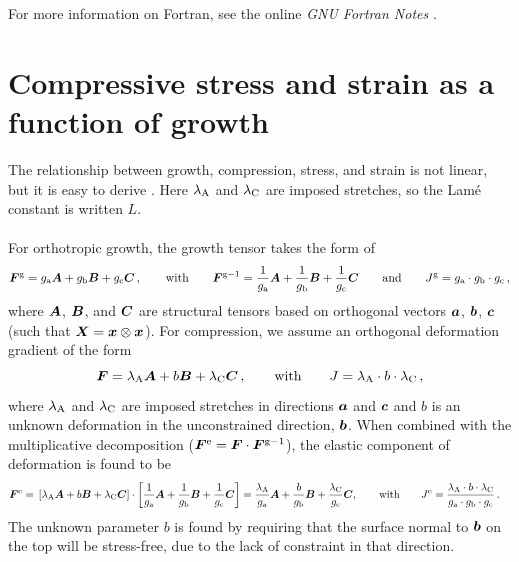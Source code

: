 \documentclass[10pt,letterpaper,oneside]{report}
\newcommand{\ten}[1]{\mbox{\boldmath $#1$}{}}
\newcommand{\scas}[1]{\mbox{{\scriptsize{${\rm{#1}}$}}}{}}
\begin{document}
For more information on Fortran, see the online \textit{GNU Fortran Notes} \autocite{FortranNotes}.



\chapter{Compressive stress and strain as a function of growth}

The relationship between growth, compression, stress, and strain is not linear, but it is easy to derive \autocite{Holland2017}.  Here $\lambda_{\scas{A}}$ and $\lambda_{\scas{C}}$ are imposed stretches, so the Lamé constant is written $L$. 
\\ \\ \noindent 
For orthotropic growth, the growth tensor takes the form of 
\begin{equation}
\ten{F}^{\scas{g}} = g_{\scas{a}} \ten{A} + g_{\scas{b}} \ten{B} + g_{\scas{c}} \ten{C} \, , 
\qquad \text{with} \qquad 
\ten{F}^{\scas{g}-1} = \frac{1}{g_{\scas{a}}} \ten{A} + \frac{1}{g_{\scas{b}}} \ten{B} + \frac{1}{g_{\scas{c}}} \ten{C} 
\qquad \text{and} \qquad 
J^{\scas{g}} = g_{\scas{a}} \cdot g_{\scas{b}} \cdot g_{\scas{c}} \, ,
\end{equation}
where $\ten{A}$, $\ten{B}$, and $\ten{C}$ are structural tensors based on orthogonal vectors $\ten{a}$, $\ten{b}$, $\ten{c}$ (such that $\ten{X} = \ten{x} \otimes \ten{x}$).  
For compression, we assume an orthogonal deformation gradient of the form
\begin{equation}
\ten{F} = \lambda_{\scas{A}} \ten{A} + b \ten{B} + \lambda_{\scas{C}} \ten{C} \, , 
\qquad \text{with} \qquad 
J = \lambda_{\scas{A}} \cdot b \cdot \lambda_{\scas{C}} \, , 
\end{equation}
where $\lambda_{\scas{A}}$ and $\lambda_{\scas{C}}$ are imposed stretches in directions $\ten{a}$ and $\ten{c}$ and $b$ is an unknown deformation in the unconstrained direction, $\ten{b}$.  When combined with the multiplicative decomposition ($ \ten{F}^{\scas{e}} = \ten{F} \cdot \ten{F}^{\scas{g}-1} $), the elastic component of deformation is found to be
\begin{align}
\ten{F}^{\scas{e}} ={}& \left[ \lambda_{\scas{A}} \ten{A} + b \ten{B} + \lambda_{\scas{C}} \ten{C} \right] \cdot \left[ \frac{1}{g_{\scas{a}}} \ten{A} + \frac{1}{g_{\scas{b}}} \ten{B} + \frac{1}{g_{\scas{c}}} \ten{C} \right] = \frac{\lambda_{\scas{A}} }{g_{\scas{a}}} \ten{A} + \frac{b}{g_{\scas{b}}} \ten{B} + \frac{\lambda_{\scas{C}} }{g_{\scas{c}}} \ten{C}
, 
\qquad \text{with} \qquad
J^{\scas{e}} = \frac{\lambda_{\scas{A}} \cdot b \cdot \lambda_{\scas{C}} }{g_{\scas{a}} \cdot g_{\scas{b}} \cdot g_{\scas{c}}} \, . 
\end{align}
The unknown parameter $b$ is found by requiring that the surface normal to $\ten{b}$ on the top will be stress-free, due to the lack of constraint in that direction.  
\end{document}
